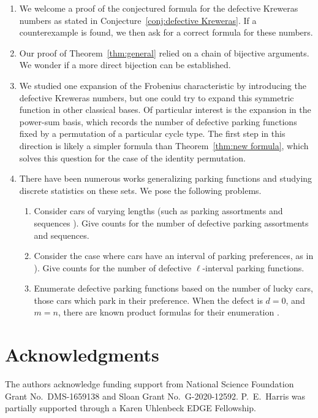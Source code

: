 \documentclass[11pt,reqno]{BICA}
\theoremstyle{definition}
\begin{document}
\begin{enumerate}
\item We welcome a proof of the conjectured formula for the defective Kreweras numbers as stated in Conjecture~\ref{conj:defective Kreweras}. If a counterexample is found, we then ask for a correct formula for these numbers.

\item Our proof of Theorem~\ref{thm:general} relied on a chain of bijective arguments. We wonder if a more direct bijection can be established. 

\item We studied one expansion of the Frobenius characteristic by introducing the defective Kreweras numbers,
but one could try to expand this symmetric function in other classical bases.
Of particular interest is the expansion in the power-sum basis, which records the number of defective parking functions fixed by a permutation of a particular cycle type.
The first step in this direction is likely a simpler formula than Theorem~\ref{thm:new formula}, which solves this question for the case of the identity permutation.

\item 
There have been numerous works generalizing parking functions and studying discrete statistics on these sets. We pose the following problems.

\begin{enumerate}
    \item Consider cars of varying lengths (such as parking assortments and sequences \cites{assortments1,sequences}). Give counts for the number of defective parking assortments and sequences.
    \item Consider the case where cars have an interval of parking preferences, as in \cite{ell_interval_pfs}). Give counts for the number of defective $\ell$-interval parking functions.
    \item Enumerate defective parking functions based on the number of lucky cars, those cars which park in their preference. When the defect is $d=0$, and $m=n$, there are known product formulas for their enumeration \cite{GesselSeo}. 
\end{enumerate}
\end{enumerate}

\section*{Acknowledgments}
The authors acknowledge funding support from National Science Foundation Grant No.\ DMS-1659138 and Sloan Grant No.\ G-2020-12592. P.~E.~Harris was partially supported through a Karen Uhlenbeck EDGE Fellowship.
\end{document}
